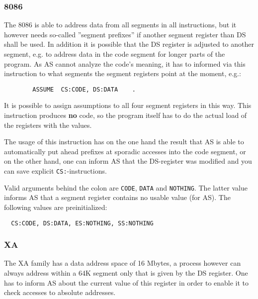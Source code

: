\documentclass[12pt,twoside]{report}
\newcommand{\bb}[1]{{\bf #1}}
\newcommand{\tty}[1]{{\tt #1}}
\begin{document}

\subsubsection{8086}

The 8086 is able to address data from all segments in all
instructions, but it however needs so-called ''segment prefixes'' if
another segment register than DS shall be used.  In addition it is
possible that the DS register is adjusted to another segment, e.g. to
address data in the code segment for longer parts of the program.  As
AS cannot analyze the code's meaning, it has to informed via this
instruction to what segments the segment registers point at the
moment, e.g.:
\begin{verbatim}
        ASSUME  CS:CODE, DS:DATA    .
\end{verbatim}
It is possible to assign assumptions to all four segment registers in
this way.  This instruction produces \bb{no} code, so the program itself
has to do the actual load of the registers with the values.

The usage of this instruction has on the one hand the result that AS is
able to automatically put ahead prefixes at sporadic accesses into the
code segment, or on the other hand, one can inform AS that the DS-register
was modified and you can save explicit \tty{CS:}-instructions.

Valid arguments behind the colon are \tty{CODE}, \tty{DATA} and
\tty{NOTHING}.  The latter value informs AS that a segment register
contains no usable value (for AS).  The following values are
preinitialized:
\begin{verbatim}
  CS:CODE, DS:DATA, ES:NOTHING, SS:NOTHING
\end{verbatim}


\subsubsection{XA}

The XA family has a data address space of 16 Mbytes, a process however
can always address within a 64K segment only that is given by the DS
register.  One has to inform AS about the current value of this
register in order to enable it to check accesses to absolute
addresses.

\end{document}
